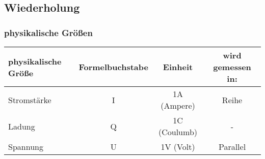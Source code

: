 \documentclass[../../main.tex]{subfiles}
\begin{document}
\subsection{Wiederholung}
\subsubsection{physikalische Größen}
\begin{tabular}[h]{l|c|c|c}
physikalische Größe & Formelbuchstabe & Einheit & wird gemessen in: \\
\hline
Stromstärke & I & 1A (Ampere) & Reihe \\
Ladung & Q & 1C (Coulumb) & - \\
Spannung & U & 1V (Volt) & Parallel
\end{tabular}
\end{document}
